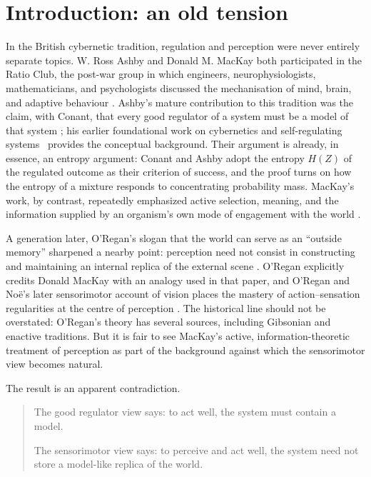 \documentclass[11pt]{article}
\theoremstyle{remark}
\newcommand{\1}{\mathbb 1}
\begin{document}
\section{Introduction: an old tension}

In the British cybernetic tradition, regulation and perception were never entirely separate topics. W. Ross Ashby and Donald M. MacKay both participated in the Ratio Club, the post-war group in which engineers, neurophysiologists, mathematicians, and psychologists discussed the mechanisation of mind, brain, and adaptive behaviour \citep{Husbands-ratio08}. Ashby's mature contribution to this tradition was the claim, with Conant, that every good regulator of a system must be a model of that system \citep{Conant-good70}; his earlier foundational work on cybernetics and self-regulating systems~\citep{Ashby-introduction56} provides the conceptual background. Their argument is already, in essence, an entropy argument: Conant and Ashby adopt the entropy $H(Z)$ of the regulated outcome as their criterion of success, and the proof turns on how the entropy of a mixture responds to concentrating probability mass. MacKay's work, by contrast, repeatedly emphasized active selection, meaning, and the information supplied by an organism's own mode of engagement with the world \citep{MacKay-space62,MacKay-information69}.

A generation later, O'Regan's slogan that the world can serve as an ``outside memory'' sharpened a nearby point: perception need not consist in constructing and maintaining an internal replica of the external scene \citep{ORegan-real92}. O'Regan explicitly credits Donald MacKay with an analogy used in that paper, and O'Regan and No\"e's later sensorimotor account of vision places the mastery of action--sensation regularities at the centre of perception \citep{ORegan-sensorimotor01}. The historical line should not be overstated: O'Regan's theory has several sources, including Gibsonian and enactive traditions. But it is fair to see MacKay's active, information-theoretic treatment of perception as part of the background against which the sensorimotor view becomes natural.

The result is an apparent contradiction.
\begin{quote}
The good regulator view says: to act well, the system must contain a model.

The sensorimotor view says: to perceive and act well, the system need not store a model-like replica of the world.
\end{quote}
\end{document}
